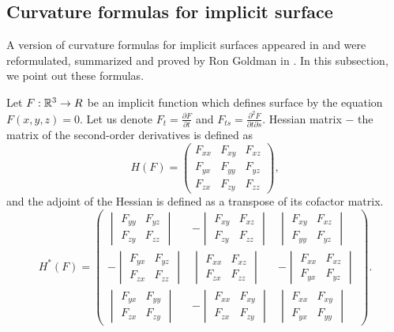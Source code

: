 \subsection{Curvature formulas for implicit surface}

A version of curvature formulas for implicit surfaces appeared in \cite{spivak1975comprehensive}
and were reformulated, summarized and proved by Ron Goldman in \cite{goldman2005curvature}.
In this subsection, we point out these formulas.

Let $F:\R^3 \to R$ be an implicit function which defines surface by the equation $F(x, y, z) = 0$. 
Let us denote $F_t = \frac{\partial F}{\partial t}$ and $F_{ts} = \frac{\partial^2 F}{\partial t \partial s}$.
Hessian matrix $-$ the matrix of the second-order derivatives is defined as 
$$
H(F) = 
\begin{pmatrix}
    F_{xx} & F_{xy} & F_{xz} \\
    F_{yx} & F_{yy} & F_{yz} \\
    F_{zx} & F_{zy} & F_{zz}
\end{pmatrix},
$$
and the adjoint of the Hessian is defined as a transpose of its cofactor matrix.
$$
H^*(F) = 
\begin{pmatrix}
    \begin{vmatrix} F_{yy} & F_{yz} \\ F_{zy} & F_{zz} \end{vmatrix} & 
    -\begin{vmatrix} F_{xy} & F_{xz} \\ F_{zy} & F_{zz} \end{vmatrix} &
    \begin{vmatrix} F_{xy} & F_{xz} \\ F_{yy} & F_{yz} \end{vmatrix} \\

    -\begin{vmatrix} F_{yx} & F_{yz} \\ F_{zx} & F_{zz} \end{vmatrix} &
    \begin{vmatrix} F_{xx} & F_{xz} \\ F_{zx} & F_{zz} \end{vmatrix} & 
    -\begin{vmatrix} F_{xx} & F_{xz} \\ F_{yx} & F_{yz} \end{vmatrix} \\

    \begin{vmatrix} F_{yx} & F_{yy} \\ F_{zx} & F_{zy} \end{vmatrix} & 
    -\begin{vmatrix} F_{xx} & F_{xy} \\ F_{zx} & F_{zy} \end{vmatrix} & 
    \begin{vmatrix} F_{xx} & F_{xy} \\ F_{yx} & F_{yy} \end{vmatrix}
\end{pmatrix}.
$$

